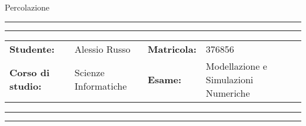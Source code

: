 \documentclass[11pt]{article}
\newcommand{\studentname}{Alessio Russo}
\newcommand{\studentnumber}{376856}
\newcommand{\course}{Scienze Informatiche}
\newcommand{\exam}{Modellazione e Simulazioni Numeriche}
\begin{document}
\begin{center}
{\Huge{Percolazione}} \\
\end{center}

\vspace{5mm}
\hrule
\vspace{1mm}
\hrule
\vspace{3mm}
\begin{center}
	\begin{tabular}{llll}
		\textbf{Studente: } & {\studentname}  & \textbf{Matricola:}  & {\studentnumber}  \\ 
		\textbf{Corso di studio: } & {\course}& \textbf{Esame:} & {\exam}\\ 
	\end{tabular}
\end{center}
\vspace{3mm}
\hrule
\vspace{1mm}
\hrule


\end{document}
